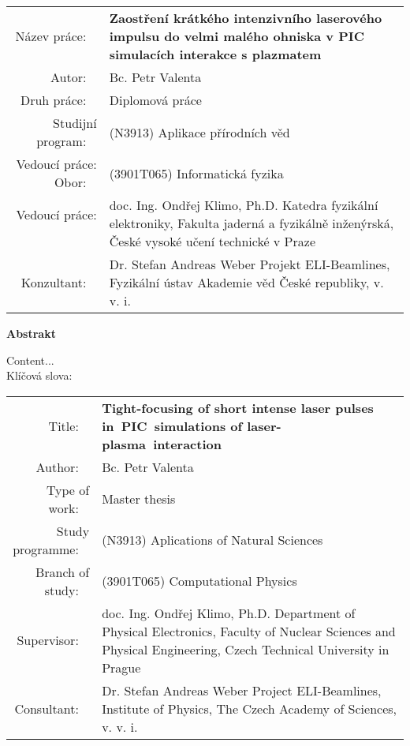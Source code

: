 \documentclass[12pt, twoside, a4paper, openright]{report}
\newcommand{\projecttitle}{Tight-focusing of short intense laser pulses in~PIC~simulations of laser-plasma~interaction }
\newcommand{\projecttitlecz}{Zaostření krátkého intenzivního laserového impulsu do velmi malého ohniska v PIC simulacích interakce s plazmatem }
\newcommand{\valenta}{Bc. Petr Valenta }
\newcommand{\klimo}{doc. Ing. Ondřej Klimo, Ph.D. }
\newcommand{\weber}{Dr. Stefan Andreas Weber }
\begin{document}

\newpage
\thispagestyle{empty}
\mbox{}


\newpage
\begin{flushleft}
	\renewcommand{\arraystretch}{1.3}
	\begin{tabular}{r p{12cm}}
		Název práce:
		~ & \bf \projecttitlecz \\
		Autor:
		~ & \valenta \\
		Druh práce:
		~ & Diplomová práce \\
		Studijní program:
		~ & (N3913) Aplikace přírodních věd\\
		Vedoucí práce:
		Obor:
		~ & (3901T065) Informatická fyzika\\
		Vedoucí práce:
		~ & \klimo \newline Katedra fyzikální elektroniky, Fakulta jaderná a fyzikálně inženýrská, České vysoké učení technické v Praze \\
		Konzultant:
		~ & \weber \newline Projekt ELI-Beamlines, Fyzikální ústav Akademie věd České republiky, v. v. i. \\
	\end{tabular}
\end{flushleft}

\begin{center}
\textbf{Abstrakt}\\
\end{center}

Content...\\

Klíčová slova:



\newpage
\begin{flushleft}
	\renewcommand{\arraystretch}{1.3}
	\begin{tabular}{r p{12cm}}
		Title:
		~ & \bf \projecttitle \\
		Author:
		~ & \valenta \\
		Type of work:
		~ & Master thesis \\
		Study programme:
		~ & (N3913) Aplications of Natural Sciences	 \\
		Branch of study:
		~ & (3901T065) Computational Physics \\
		Supervisor:
		~ & \klimo \newline Department of Physical Electronics, Faculty of Nuclear Sciences and Physical Engineering, Czech Technical University in Prague \\
		Consultant:
		~ & \weber \newline Project ELI-Beamlines, Institute of Physics, The Czech Academy of Sciences, v. v. i. \\
	\end{tabular}
\end{flushleft}
\end{document}
